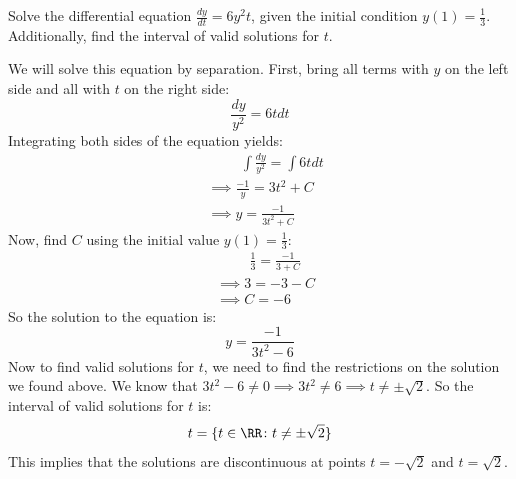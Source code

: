 \begin{example}
    Solve the differential equation $\frac{dy}{dt} = 6y^2t$, given the initial condition $y(1) = \frac{1}{3}$. Additionally, find the interval of valid solutions for $t$.
\end{example}
\begin{solution}
    We will solve this equation by separation. First, bring all terms with $y$ on the left side and all with $t$ on the right side:
    \[\frac{dy}{y^2} = 6t dt\]
    Integrating both sides of the equation yields:
    \begin{align*}
        &\hspace{1cm} \int \frac{dy}{y^2} = \int 6t dt \\
        & \implies \frac{-1}{y} = 3t^2 + C \\
        & \implies y = \frac{-1}{3t^2 + C}
    \end{align*}
    Now, find $C$ using the initial value $y(1) = \frac{1}{3}$:
    \begin{align*}
        &\hspace{1cm} \frac{1}{3} = \frac{-1}{3 + C} \\
        & \implies 3 = -3 - C \\
        & \implies C = -6
    \end{align*}
    So the solution to the equation is:
    \[y = \frac{-1}{3t^2 - 6}\]
    Now to find valid solutions for $t$, we need to find the restrictions on the solution we found above. We know that $3t^2 - 6 \neq 0 \implies 3t^2 \neq 6 \implies t \neq \pm\sqrt{2}$. So the interval of valid solutions for $t$ is:
    \[t = \{t \in \RR \colon t \neq \pm \sqrt{2}\}\]
    This implies that the solutions are discontinuous at points $t = -\sqrt{2}$ and $t = \sqrt{2}$.
\end{solution}


